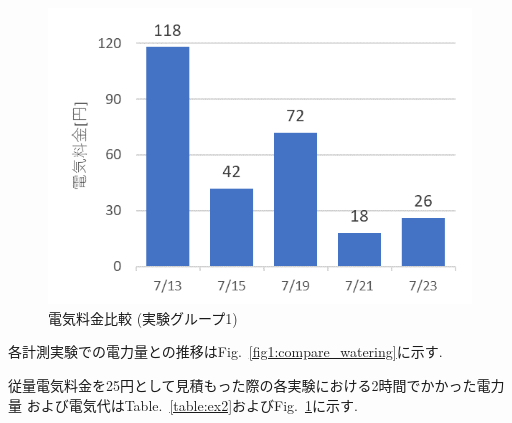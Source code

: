 \documentclass[a4j,fleqn,dvipdfmx,uplatex]{jsarticle}
\newcommand{\figref}[1]{Fig.\ \ref{#1}}
\newcommand{\tableref}[1]{Table.\ \ref{#1}}
\begin{document}
\begin{figure}[htb]
  \centering
  \includegraphics[width=0.8\linewidth]{img/fee_27.png}
  \caption{電気料金比較 (実験グループ1)}
  \label{fig:fee_27}
\end{figure}

各計測実験での電力量との推移は\figref{fig1:compare_watering}に示す. 

従量電気料金を25円として見積もった際の各実験における2時間でかかった電力量
および電気代は\tableref{table:ex2}および\figref{fig:fee_27}に示す. 



  
\end{document}
